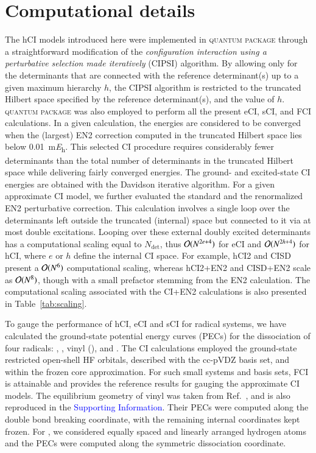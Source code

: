 \documentclass[aip,jcp,reprint,noshowkeys,superscriptaddress]{revtex4-1}
\newcommand{\SupInf}{\textcolor{blue}{Supporting Information}}
\newcommand{\QP}{\textsc{quantum package}}
\newcommand{\Ndet}{N_\text{det}}
\begin{document}
\section{Computational details}
\label{sec:compdet}

The hCI models introduced here were implemented in {\QP} \cite{Garniron_2019} through a straightforward modification of the
\textit{configuration interaction using a perturbative selection made iteratively} (CIPSI) algorithm. \cite{Huron_1973,Giner_2013,Giner_2015,Garniron_2018}
By allowing only for the determinants that are connected with the reference determinant(s) up to a given maximum hierarchy $h$,
the CIPSI algorithm is restricted to the truncated Hilbert space specified by the reference determinant(s), and the value of $h$.
{\QP} \cite{Garniron_2019} was also employed to perform all the present eCI, sCI, and FCI calculations.
In a given calculation, the energies are considered to be converged when the (largest) EN2 correction computed in the truncated Hilbert space
lies below \SI{0.01}{\milli\hartree}. \cite{Garniron_2018}
This selected CI procedure requires considerably fewer determinants than the total number of determinants in the truncated Hilbert space
while delivering fairly converged energies.
The ground- and excited-state CI energies are obtained with the Davidson iterative algorithm. \cite{Davidson_1975}
For a given approximate CI model, we further evaluated the standard and the renormalized EN2 perturbative correction. \cite{Garniron_2019}
This calculation involves a single loop over the determinants left outside the truncated (internal) space but connected to it via at most double excitations.
Looping over these external doubly excited determinants has a computational scaling equal to $\Ndet$,
thus $\order*{N^{2e+4}}$ for eCI and $\order*{N^{2h+4}}$ for hCI, where $e$ or $h$ define the internal CI space.
For example, hCI2 and CISD present a $\order*{N^6}$ computational scaling, whereas hCI2+EN2 and CISD+EN2 scale as $\order*{N^8}$,
though with a small prefactor stemming from the EN2 calculation.
The computational scaling associated with the CI+EN2 calculations is also presented in Table~\ref{tab:scaling}.

To gauge the performance of hCI, eCI and sCI for radical systems,
we have calculated the ground-state potential energy curves (PECs) for the dissociation of four radicals:
, , vinyl (), and .
The CI calculations employed the ground-state restricted open-shell HF orbitals, described with the cc-pVDZ basis set, and within the frozen core approximation.
For such small systems and basis sets, FCI is attainable and provides the reference results for gauging the approximate CI models.
The equilibrium geometry of vinyl was taken from Ref.~, and is also reproduced in the {\SupInf}.
Their PECs were computed along the  double bond breaking coordinate, with the remaining internal coordinates kept frozen.
For , we considered equally spaced and linearly arranged hydrogen atoms and the PECs were computed along the symmetric dissociation coordinate.
\end{document}
